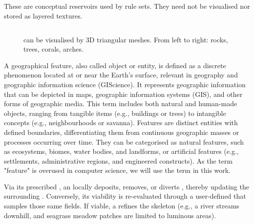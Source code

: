 These  are conceptual reservoirs used by rule sets. They need not be visualised nor stored as layered textures.

\subsection{}
\label{sec:env-obj-environmental-objects}

\begin{figure}
    \caption{ can be visualised by 3D triangular meshes. From left to right: rocks, trees, corals, arches.}
    \label{fig:env-obj-assets}
\end{figure}

A geographical feature, also called object or entity, is defined as a discrete phenomenon located at or near the Earth's surface, relevant in geography and geographic information science (GIScience). It represents geographic information that can be depicted in maps, geographic information systems (GIS), and other forms of geographic media. This term includes both natural and human-made objects, ranging from tangible items (e.g., buildings or trees) to intangible concepts (e.g., neighbourhoods or savanna). Features are distinct entities with defined boundaries, differentiating them from continuous geographic masses or processes occurring over time. They can be categorised as natural features, such as ecosystems, biomes, water bodies, and landforms, or artificial features (e.g., settlements, administrative regions, and engineered constructs). As the term "feature" is overused in computer science, we will use the term  in this work.


Via its prescribed , an  locally deposits, removes, or diverts , thereby updating the surrounding . Conversely, its viability is re-evaluated through a user-defined  that samples those same fields. If viable, a  refines the skeleton (e.g., a river streams downhill, and seagrass meadow patches are limited to luminous areas).

